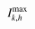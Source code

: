 

    \[\let\par\empty

    
{{{{\miitalic{I}}}\sb{{{\miitalic{k}}{\miitalic{,}}{\miitalic{h}}}}\sp{{\minormal{max}}}}}


    \]

  
